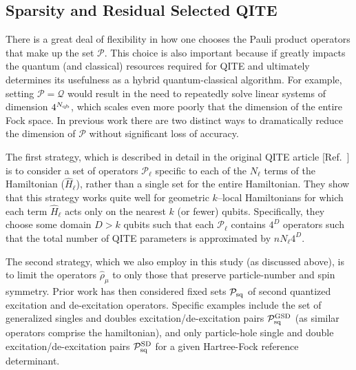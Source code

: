 \documentclass[aip,jcp,amsmath,amssymb, reprint]{revtex4-1}
\begin{document}
\subsection{Sparsity and Residual Selected QITE}
\label{sec:selected_qite}

There is a great deal of flexibility in how one chooses the Pauli product operators that make up the set $\mathcal{P}$. 
This choice is also important because if greatly impacts the quantum (and classical) resources required for QITE and ultimately determines its usefulness as a hybrid quantum-classical algorithm. 
For example, setting $\mathcal{P} = \mathcal{Q}$ would result in the need to repeatedly solve linear systems of dimension $4^{N_{\rm{qb}}}$, which scales even more poorly that the dimension of the entire Fock space.
In previous work there are two distinct ways to dramatically reduce the dimension of $\mathcal{P}$ without significant loss of accuracy.

The first strategy, which is described in detail in the original QITE article [Ref.~] is to consider a set of operators $\mathcal{P}_\ell$ specific to each of the $N_\ell$ terms of the Hamiltonian ($\hat{H}_\ell$), rather than a single set for the entire Hamiltonian. They show that this strategy works quite well for geometric $k$--local Hamiltonians for which each term $\hat{H}_\ell$ acts only on the nearest $k$ (or fewer) qubits.      
Specifically, they choose some domain $D>k$ qubits such that each $\mathcal{P}_\ell$ contains $4^{D}$ operators such that the total number of QITE parameters is approximated by $n N_\ell 4^D$.

The second strategy, which we also employ in this study (as discussed above), is to limit the operators $ \hat{\rho}_\mu$ to only those that preserve particle-number and spin symmetry. 
Prior work \cite{} has then considered fixed sets $\mathcal{P}_{\rm{sq}}$ of second quantized excitation and de-excitation operators.
Specific examples include the set of generalized singles and doubles excitation/de-excitation pairs $\mathcal{P}_{\rm{sq}}^{\rm{GSD}}$ (as similar operators comprise the hamiltonian), and only particle-hole single and double excitation/de-excitation pairs $\mathcal{P}_{\rm{sq}}^{\rm{SD}}$ for a given Hartree-Fock reference determinant.
\end{document}
